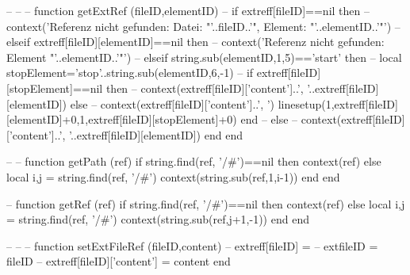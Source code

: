 --%
--%
--%
function getExtRef (fileID,elementID)
	--%
	if extreff[fileID]==nil then
		--%
		context('Referenz nicht gefunden: Datei: "'..fileID..'", Element: "'..elementID..'"')
	--%
	elseif extreff[fileID][elementID]==nil then
		--%
		context('Referenz nicht gefunden: Element "'..elementID..'"')
	--%
	elseif string.sub(elementID,1,5)=='start' then
		--%
		local stopElement='stop'..string.sub(elementID,6,-1)
		--%
		if extreff[fileID][stopElement]==nil then
			--%
			context(extreff[fileID]['content']..', '..extreff[fileID][elementID])
		else
			--%
			context(extreff[fileID]['content']..', ')
			linesetup(1,extreff[fileID][elementID]+0,1,extreff[fileID][stopElement]+0)
		end
	--%
	else
		--%
		context(extreff[fileID]['content']..', '..extreff[fileID][elementID])
	end
end

--%
--%
function getPath (ref)
	if string.find(ref, '/#')==nil then
		context(ref)
	else
		local i,j = string.find(ref, '/#')
		context(string.sub(ref,1,i-1))
	end
end

--%
function getRef (ref)
	if string.find(ref, '/#')==nil then
		context(ref)
	else
		local i,j = string.find(ref, '/#')
		context(string.sub(ref,j+1,-1))
	end
end

--%
--%
--%
function setExtFileRef (fileID,content)
	--%
	extreff[fileID] = {}
	--%
	extfileID = fileID
	--%
	extreff[fileID]['content'] = content
end

